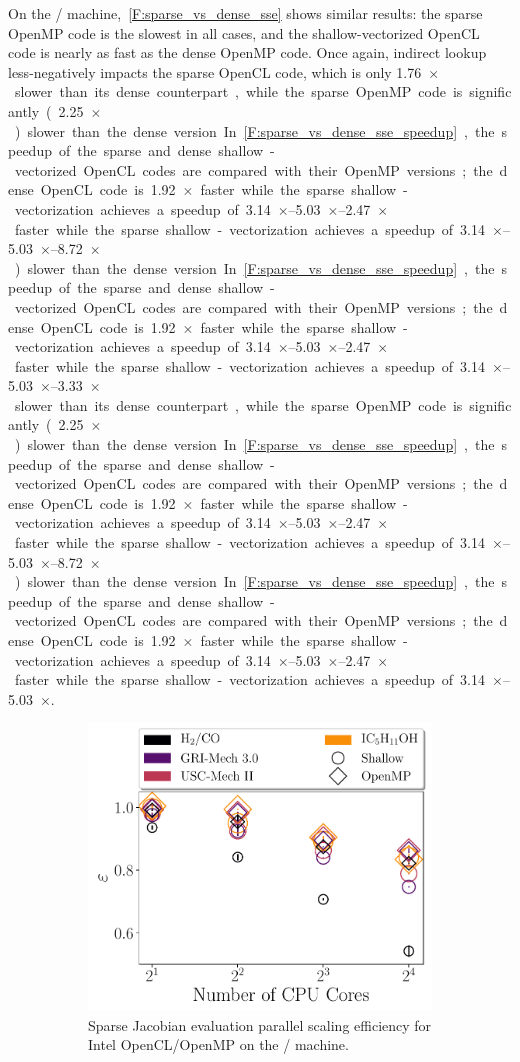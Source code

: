 \documentclass[12pt,number,sort&compress,preprint]{elsarticle}
\begin{document}
On the \sse/ machine,~\cref{F:sparse_vs_dense_sse} shows similar results: the sparse OpenMP code is the slowest in all cases, and the shallow-vectorized OpenCL code is nearly as fast as the dense OpenMP code.
Once again, indirect lookup less-negatively impacts the sparse OpenCL code, which is only \SIrange{1.76}{3.33}{$\times$} slower than its dense counterpart, while the sparse OpenMP code is significantly (\SIrange{2.25}{8.72}{$\times$}) slower than the dense version.
In~\cref{F:sparse_vs_dense_sse_speedup}, the speedup of the sparse and dense shallow-vectorized OpenCL codes are compared with their OpenMP versions; the dense OpenCL code is \SIrange{1.92}{2.47}{$\times$} faster while the sparse shallow-vectorization achieves a speedup of \SIrange{3.14}{5.03}{$\times$}.

\begin{figure}[htbp]
   \centering
  \begin{subfigure}[t]{0.48\linewidth}
      \includegraphics[width=\textwidth]{sparse_jac_scaling.pdf}
      \caption{Sparse Jacobian evaluation parallel scaling efficiency for Intel OpenCL\slash OpenMP on the \avx/ machine.}
      \label{F:sparse_jac_scaling}
  \end{subfigure}
  \hfill
  \begin{subfigure}[t]{0.48\linewidth}

\end{subfigure}
\end{figure}
\end{document}
